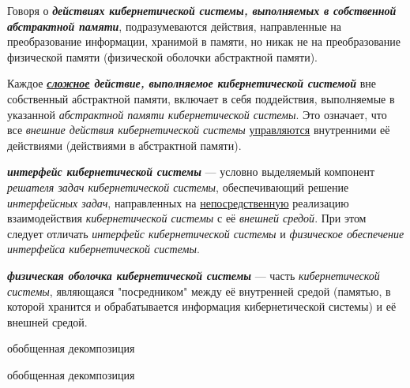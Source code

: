 Говоря о \textbf{\textit{действиях кибернетической системы, выполняемых в собственной абстрактной памяти}}, подразумеваются действия, направленные на преобразование информации, хранимой в памяти, но никак не на преобразование физической памяти (физической оболочки абстрактной памяти).

Каждое \textbf{\textit{\uline{сложное} действие, выполняемое кибернетической системой}} вне собственный абстрактной памяти, включает в себя поддействия, выполняемые в указанной \textit{абстрактной памяти кибернетической системы}. 
Это означает, что все \textit{внешние действия кибернетической системы} \uline{управляются} внутренними её действиями (действиями в абстрактной памяти).


\textbf{\textit{интерфейс кибернетической системы}} --- условно выделяемый компонент \textit{решателя задач кибернетической системы}, обеспечивающий решение \textit{интерфейсных задач}, направленных на \uline{непосредственную} реализацию взаимодействия \textit{кибернетической системы} с её \textit{внешней средой}. При этом следует отличать \textit{интерфейс кибернетической системы} и \textit{физическое обеспечение интерфейса кибернетической системы}.

\textbf{\textit{физическая оболочка кибернетической системы}} --- часть \textit{кибернетической системы}, являющаяся "посредником"{} между её внутренней средой (памятью, в которой хранится и обрабатывается информация кибернетической системы) и её внешней средой.

\begin{SCn}
	\begin{scnrelfromset}{обобщенная декомпозиция}
	\end{scnrelfromset}
\end{SCn}


\begin{SCn}
	\begin{scnrelfromset}{обобщенная декомпозиция}
	\end{scnrelfromset}
\end{SCn}

